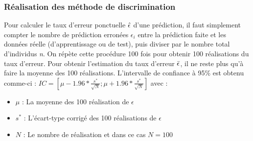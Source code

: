 \documentclass[a4paper,11pt,oneside,roman]{article}
\begin{document}
\subsubsection{Réalisation des méthode de discrimination}
Pour calculer le taux d'erreur ponctuelle $\Hat{\epsilon}$ d'une prédiction, il faut simplement compter le nombre de prédiction erronées $\epsilon_i$ entre la prédiction faite et les données réelle (d'apprentissage ou de test), puis diviser par le nombre total d'individus \textit{n}. \newline
On répète cette procédure 100 fois pour obtenir 100 réalisations du taux d'erreur. Pour obtenir l'estimation du taux d'erreur $\Bar{\epsilon}$, il ne reste plus qu'à faire la moyenne des 100 réalisations. \newline
L'intervalle de confiance à 95\% est obtenu comme-ci : $IC = \left[\mu - 1.96*\frac{s^{*}}{\sqrt{N}};\mu + 1.96*\frac{s^{*}}{\sqrt{N}} \right]$ avec : \newline
\begin{itemize}
    \item $\mu$ : La moyenne des 100 réalisation de $\epsilon$ \\
    \item $s^{*}$ : L'écart-type corrigé des 100 réalisations de $\epsilon$ \\
    \item $N$ : Le nombre de réalisation et dans ce cas $N=100$
\end{itemize}
\end{document}
